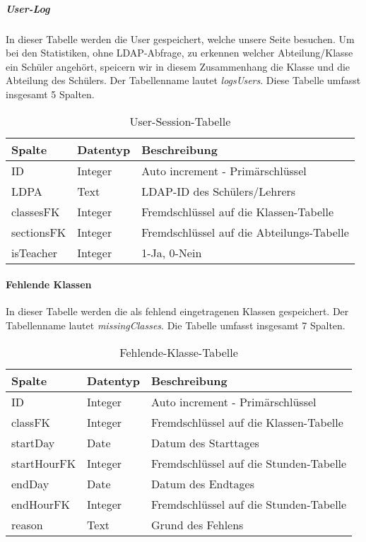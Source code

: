 \subparagraph{User-Log\\}
In dieser Tabelle werden die User gespeichert, welche unsere Seite besuchen. Um bei den Statistiken, ohne LDAP-Abfrage, zu erkennen welcher Abteilung/Klasse ein Schüler angehört, speicern wir in diesem Zusammenhang die Klasse und die Abteilung des Schülers. Der Tabellenname lautet \textit{logsUsers}. Diese Tabelle umfasst insgesamt 5 Spalten. 

\begin{table}[H]
\centering
\begin{tabular}{p{2.5 cm}p{2.5 cm}p{10 cm}}
   \toprule
   \textbf{Spalte} & \textbf{Datentyp} & \textbf{Beschreibung} \\
   \midrule
          ID & Integer & Auto increment - Primärschlüssel  \\
          \hline
          LDPA & Text & LDAP-ID des Schülers/Lehrers   \\
          \hline
	      classesFK & Integer & Fremdschlüssel auf die Klassen-Tabelle   \\
	      \hline
          sectionsFK & Integer & Fremdschlüssel auf die Abteilungs-Tabelle   \\
          \hline
          isTeacher & Integer & 1-Ja, 0-Nein  \\
   \bottomrule
\end{tabular}
\caption{User-Session-Tabelle}
\end{table}

\paragraph{Fehlende Klassen\\}
In dieser Tabelle werden die als fehlend eingetragenen Klassen gespeichert. Der Tabellenname lautet \textit{missingClasses}. Die Tabelle umfasst insgesamt 7 Spalten.

\begin{table}[H]
\centering
\begin{tabular}{p{2.5 cm}p{2.5 cm}p{10 cm}}
   \toprule
   \textbf{Spalte} & \textbf{Datentyp} & \textbf{Beschreibung} \\
   \midrule
          ID & Integer & Auto increment - Primärschlüssel  \\
          \hline
          classFK & Integer & Fremdschlüssel auf die Klassen-Tabelle   \\
          \hline
	      startDay & Date & Datum des Starttages   \\
	      \hline
          startHourFK & Integer & Fremdschlüssel auf die Stunden-Tabelle   \\
          \hline
          endDay & Date & Datum des Endtages   \\
          \hline
          endHourFK & Integer & Fremdschlüssel auf die Stunden-Tabelle   \\
          \hline
          reason & Text & Grund des Fehlens  \\
   \bottomrule
\end{tabular}
\caption{Fehlende-Klasse-Tabelle}
\end{table}

